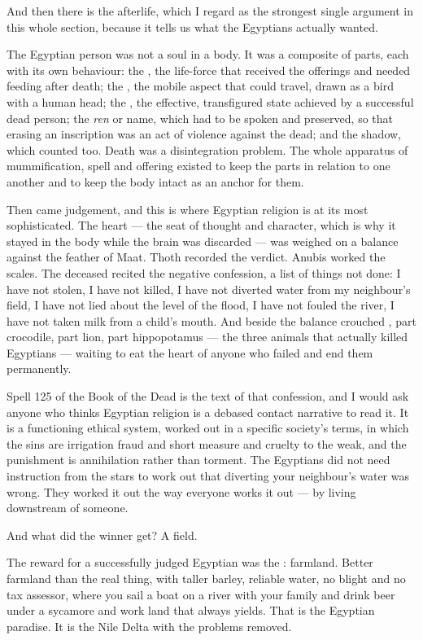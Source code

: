 And then there is the afterlife, which I regard as the strongest single argument in this whole
section, because it tells us what the Egyptians actually wanted.

The Egyptian person was not a soul in a body. It was a composite of parts, each with its own
behaviour: the , the life-force that received the offerings and needed feeding after
death; the , the mobile aspect that could travel, drawn as a bird with a human head;
the , the effective, transfigured state achieved by a successful dead person; the
\emph{ren} or name, which had to be spoken and preserved, so that erasing an inscription was an
act of violence against the dead; and the shadow, which counted too. Death was a disintegration
problem. The whole apparatus of mummification, spell and offering existed to keep the parts in
relation to one another and to keep the body intact as an anchor for them.

Then came judgement, and this is where Egyptian religion is at its most sophisticated. The heart
--- the seat of thought and character, which is why it stayed in the body while the brain was
discarded --- was weighed on a balance against the feather of Maat. Thoth recorded the verdict.
Anubis worked the scales. The deceased recited the negative confession, a list of things not
done: I have not stolen, I have not killed, I have not diverted water from my neighbour's field, I
have not lied about the level of the flood, I have not fouled the river, I have not taken milk
from a child's mouth. And beside the balance crouched , part crocodile, part lion, part
hippopotamus --- the three animals that actually killed Egyptians --- waiting to eat the heart of
anyone who failed and end them permanently.

Spell 125 of the Book of the Dead is the text of that confession, and I would ask anyone who
thinks Egyptian religion is a debased contact narrative to read it. It is a functioning ethical
system, worked out in a specific society's terms, in which the sins are irrigation fraud and
short measure and cruelty to the weak, and the punishment is annihilation rather than torment. The
Egyptians did not need instruction from the stars to work out that diverting your neighbour's
water was wrong. They worked it out the way everyone works it out --- by living downstream of
someone.

And what did the winner get? A field.

The reward for a successfully judged Egyptian was the : farmland. Better
farmland than the real thing, with taller barley, reliable water, no blight and no tax
assessor, where you sail a boat on a river with your family and drink beer under a sycamore and
work land that always yields. That is the Egyptian paradise. It is the Nile Delta with the
problems removed.

